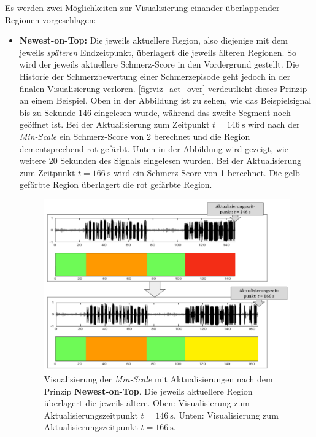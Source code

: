 Es werden zwei Möglichkeiten zur Visualisierung einander überlappender Regionen vorgeschlagen:

\begin{itemize}
\item \textbf{Newest-on-Top: } Die jeweils \glqq aktuellere\grqq{} Region, also diejenige mit dem jeweils \emph{späteren} Endzeitpunkt, überlagert die jeweils \glqq älteren\grqq{} Regionen. So wird der jeweils aktuellere Schmerz-Score in den Vordergrund gestellt. Die Historie der Schmerzbewertung einer Schmerzepisode geht jedoch in der finalen Visualisierung verloren. \autoref{fig:viz_act_over} verdeutlicht dieses Prinzip an einem Beispiel. Oben in der Abbildung ist zu sehen, wie das Beispielsignal bis zu Sekunde $146$ eingelesen wurde, während das zweite Segment noch geöffnet ist. Bei der Aktualisierung zum Zeitpunkt $t=\SI{146}{\second}$ wird nach der \emph{Min-Scale} ein Schmerz-Score von 2 berechnet und die Region dementsprechend rot gefärbt. Unten in der Abbildung wird gezeigt, wie weitere 20 Sekunden des Signals eingelesen wurden. Bei der Aktualisierung zum Zeitpunkt $t=\SI{166}{\second}$ wird ein Schmerz-Score von 1 berechnet. Die gelb gefärbte Region überlagert die rot gefärbte Region.

\begin{figure}[h]
	\centering
	\includegraphics[width=1\textwidth]{bilder/viz_act_over_03.png}
	\caption[Visualisierung bei Aktualisierungen nach dem Prinzip Newest-on-Top]{Visualisierung der \emph{Min-Scale} mit Aktualisierungen nach dem Prinzip \textbf{Newest-on-Top}. Die jeweils \glqq aktuellere\grqq{} Region überlagert die jeweils \glqq ältere\grqq{}. Oben: Visualisierung zum Aktualisierungszeitpunkt $t=\SI{146}{\second}$. Unten: Visualisierung zum Aktualisierungszeitpunkt $t=\SI{166}{\second}$.}
	\label{fig:viz_act_over}
\end{figure}


\end{itemize}
